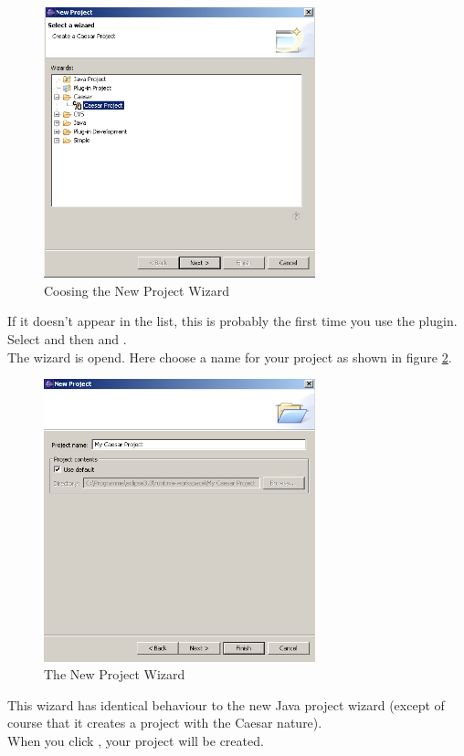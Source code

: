 \begin{figure}[htbp]
	\centering
		\includegraphics[width=0.70\textwidth]{images/project_wizard.png}
	\caption{Coosing the New Project Wizard}
	\label{fig:project_wizard}
\end{figure}

If it doesn't appear in the list, this is probably the first time you use the plugin. Select  and then  and .\\
The wizard is opend. Here choose a name for your project as shown in figure \ref{fig:project_wizard2}.

\begin{figure}[htbp]
	\centering
		\includegraphics[width=0.70\textwidth]{images/project_wizard2.png}
	\caption{The New Project Wizard}
	\label{fig:project_wizard2}
\end{figure}

This wizard has identical behaviour to the new Java project wizard (except of course that
it creates a project with the Caesar nature).\\
When you click , your project will be created.